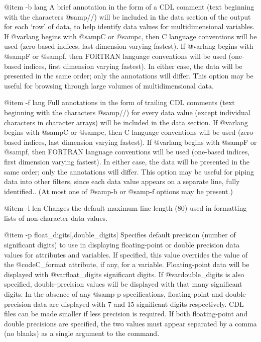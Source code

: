 {@item -b lang
A brief annotation in the form of a CDL comment (text beginning with the
characters @samp{//}) will be included in the data section of the output
for each `row' of data, to help identify data values for
multidimensional variables.  If @var{lang} begins with @samp{C} or
@samp{c}, then C language conventions will be used (zero-based indices,
last dimension varying fastest).  If @var{lang} begins with @samp{F} or
@samp{f}, then FORTRAN language conventions will be used (one-based
indices, first dimension varying fastest).  In either case, the data
will be presented in the same order; only the annotations will differ.
This option may be useful for browsing through large volumes of
multidimensional data.

@item -f lang
Full annotations in the form of trailing CDL comments (text beginning
with the characters @samp{//}) for every data value (except individual
characters in character arrays) will be included in the data section.
If @var{lang} begins with @samp{C} or @samp{c}, then C language
conventions will be used (zero-based indices, last dimension varying
fastest).  If @var{lang} begins with @samp{F} or @samp{f}, then FORTRAN
language conventions will be used (one-based indices, first dimension
varying fastest).  In either case, the data will be presented in the
same order; only the annotations will differ.  This option may be useful
for piping data into other filters, since each data value appears on a
separate line, fully identified..  (At most one of @samp{-b} or
@samp{-f} options may be present.)

@item -l len
Changes the default maximum line length (80) used in formatting lists of
non-character data values.

@item -p float_digits[,double_digits]
Specifies default precision (number of significant digits) to use in
displaying floating-point or double precision data values for attributes
and variables.  If specified, this value overrides the value of the
@code{C_format} attribute, if any, for a variable.  Floating-point data
will be displayed with @var{float_digits} significant digits.  If
@var{double_digits} is also specified, double-precision values will be
displayed with that many significant digits.  In the absence of any
@samp{-p} specifications, floating-point and double-precision data are
displayed with 7 and 15 significant digits respectively.  CDL files can
be made smaller if less precision is required.  If both floating-point
and double precisions are specified, the two values must appear
separated by a comma (no blanks) as a single argument to the command.

}
